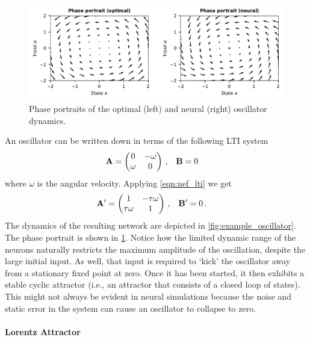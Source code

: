 \documentclass[10pt,letterpaper,oneside]{article}
\begin{document}
\begin{figure}[t]
	\centering
	\includegraphics{media/example_oscillator_phases.pdf}
	\caption{Phase portraits of the optimal (left) and neural (right) oscillator dynamics. }
	\label{fig:example_oscillator_phases}
\end{figure}

An oscillator can be written down in terms of the following LTI system
\begin{align*}
	{\mathbf{A}} &= \begin{pmatrix}0 & -\omega \\ \omega & 0\end{pmatrix} \,, & {\mathbf{B}} &= 0
\end{align*}
where $\omega$ is the angular velocity. Applying \cref{eqn:nef_lti} we get
\begin{align*}
	{\mathbf{A}}' &= \begin{pmatrix}1 & -\tau\omega \\ \tau \omega & 1\end{pmatrix} \,,  & {\mathbf{B}}' &= 0 \,.
\end{align*}
The dynamics of the resulting network are depicted in \cref{fig:example_oscillator}. The phase portrait is shown in \cref{fig:example_oscillator_phases}. Notice how the limited dynamic range of the neurons naturally restricts the maximum amplitude of the oscillation, despite the large initial input.  As well, that input is required to `kick' the oscillator away from a stationary fixed point at zero.  Once it has been started, it then exhibits a stable cyclic attractor (i.e., an attractor that consists of a closed loop of states). This might not always be evident in neural simulations because the noise and static error in the system can cause an oscillator to collapse to zero.

\paragraph{Lorentz Attractor}
\end{document}
